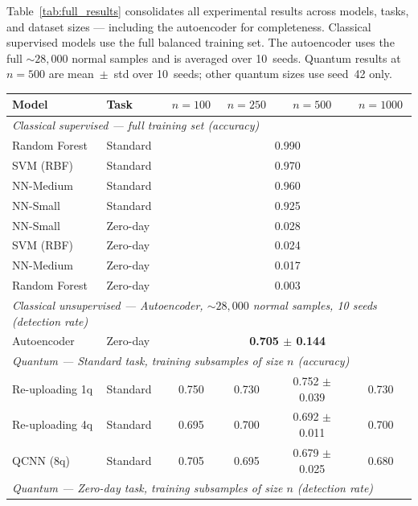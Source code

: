 \documentclass[twoside,openany,a4paper,11pt,english]{report}
\begin{document}
Table~\ref{tab:full_results} consolidates all experimental results across models, tasks, and dataset sizes --- including the autoencoder for completeness. Classical supervised models use the full balanced training set. The autoencoder uses the full ${\sim}28{,}000$ normal samples and is averaged over 10~seeds. Quantum results at $n=500$ are mean~$\pm$~std over 10~seeds; other quantum sizes use seed~42 only.

\begin{table}[ht]
\centering
\small
\begin{tabular}{llcccc}
    \toprule
    \textbf{Model} & \textbf{Task} & $n=100$ & $n=250$ & $n=500$ & $n=1000$ \\
    \midrule
    \multicolumn{6}{l}{\textit{Classical supervised --- full training set (accuracy)}} \\
    \midrule
    Random Forest   & Standard  & \multicolumn{4}{c}{0.990} \\
    SVM (RBF)       & Standard  & \multicolumn{4}{c}{0.970} \\
    NN-Medium       & Standard  & \multicolumn{4}{c}{0.960} \\
    NN-Small        & Standard  & \multicolumn{4}{c}{0.925} \\
    \midrule
    NN-Small        & Zero-day  & \multicolumn{4}{c}{0.028} \\
    SVM (RBF)       & Zero-day  & \multicolumn{4}{c}{0.024} \\
    NN-Medium       & Zero-day  & \multicolumn{4}{c}{0.017} \\
    Random Forest   & Zero-day  & \multicolumn{4}{c}{0.003} \\
    \midrule
    \multicolumn{6}{l}{\textit{Classical unsupervised --- Autoencoder, ${\sim}28{,}000$ normal samples, 10 seeds (detection rate)}} \\
    \midrule
    Autoencoder     & Zero-day  & \multicolumn{4}{c}{\textbf{0.705 $\pm$ 0.144}} \\
    \midrule
    \multicolumn{6}{l}{\textit{Quantum --- Standard task, training subsamples of size $n$ (accuracy)}} \\
    \midrule
    Re-uploading 1q & Standard  & 0.750 & 0.730 & 0.752 $\pm$ 0.039 & 0.730 \\
    Re-uploading 4q & Standard  & 0.695 & 0.700 & 0.692 $\pm$ 0.011 & 0.700 \\
    QCNN (8q)       & Standard  & 0.705 & 0.695 & 0.679 $\pm$ 0.025 & 0.680 \\
    \midrule
    \multicolumn{6}{l}{\textit{Quantum --- Zero-day task, training subsamples of size $n$ (detection rate)}} \\

\end{tabular}
\end{table}
\end{document}
